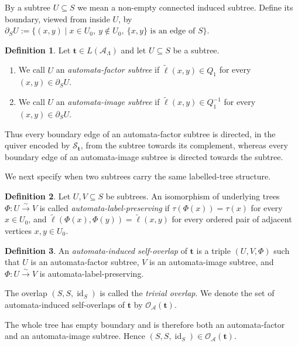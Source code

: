 \documentclass[11pt,a4paper]{amsart}
\theoremstyle{definition}
\newtheorem{definition}{Definition}[section]
\theoremstyle{plain}
\theoremstyle{remark}
\numberwithin{equation}{section}
\begin{document}
By a subtree $U\subseteq S$ we mean a non-empty connected induced subtree. Define its boundary, viewed from inside $U$, by
$
\partial_S U:=\{(x,y)\mid x\in U_0,\ y\notin U_0,\ \{x,y\}\text{ is an edge of }S\}.
$

\begin{definition}\label{def:automata-factor-image}
Let $\mathbf t\in L(\mathcal A_\Lambda)$ and let $U\subseteq S$ be a subtree.

\begin{enumerate}[label=\textup{(\roman*)}]
\item We call $U$ an \emph{automata-factor subtree} if $\widetilde{\ell}(x,y)\in Q_1$ for every $(x,y)\in\partial_S U$.
\item We call $U$ an \emph{automata-image subtree} if $\widetilde{\ell}(x,y)\in Q_1^{-1}$ for every $(x,y)\in\partial_S U$.
\end{enumerate}
\end{definition}

Thus every boundary edge of an automata-factor subtree is directed, in the quiver encoded by $\mathcal S_{\mathbf t}$, from the subtree towards its complement, whereas every boundary edge of an automata-image subtree is directed towards the subtree.

We next specify when two subtrees carry the same labelled-tree structure.

\begin{definition}\label{def:automata-labelled-isomorphism}
Let $U,V\subseteq S$ be subtrees. An isomorphism of underlying trees
$
\Phi:U\xrightarrow{\sim}V
$
is called \emph{automata-label-preserving} if
$
\tau(\Phi(x))=\tau(x)
$
for every $x\in U_0$, and
$
\widetilde{\ell}(\Phi(x),\Phi(y))
=
\widetilde{\ell}(x,y)
$
for every ordered pair of adjacent vertices $x,y\in U_0$.
\end{definition}

\begin{definition}\label{def:automata-self-overlap}
An \emph{automata-induced self-overlap} of $\mathbf t$ is a triple
$
(U,V,\Phi)
$
such that $U$ is an automata-factor subtree, $V$ is an automata-image subtree, and $\Phi:U\xrightarrow{\sim}V$ is automata-label-preserving.

The overlap $(S,S,\operatorname{id}_S)$ is called the \emph{trivial overlap}. We denote the set of automata-induced self-overlaps of $\mathbf t$ by
$\mathscr O_{\mathcal A}(\mathbf t).
$
\end{definition}

The whole tree has empty boundary and is therefore both an automata-factor and an automata-image subtree. Hence
$(S,S,\operatorname{id}_S)\in\mathscr O_{\mathcal A}(\mathbf t).$
\end{document}
